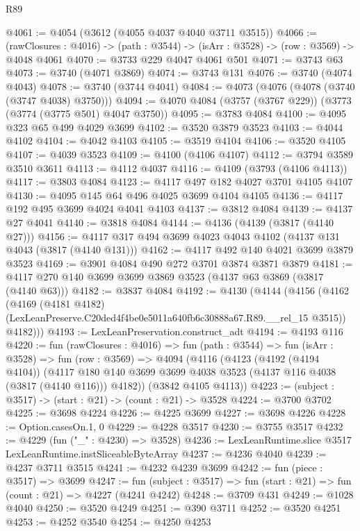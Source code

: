 \begin{lexlean}{R89}
\begin{coremodule}
@4061 := @4054 (@3612 (@4055 @4037 @4040 @3711 @3515))
@4066 := (rawClosures : @4016) -> (path : @3544) -> (isArr : @3528) -> (row : @3569) -> @4048 @4061
@4070 := @3733 @229 @4047 @4061 @501
@4071 := @3743 @63
@4073 := @3740 (@4071 @3869)
@4074 := @3743 @131
@4076 := @3740 (@4074 @4043)
@4078 := @3740 (@3744 @4041)
@4084 := @4073 (@4076 (@4078 (@3740 (@3747 @4038) @3750)))
@4094 := @4070 @4084 (@3757 (@3767 @229)) (@3773 (@3774 (@3775 @501) @4047 @3750))
@4095 := @3783 @4084
@4100 := @4095 @323 @65 @499 @4029 @3699
@4102 := @3520 @3879 @3523
@4103 := @4044 @4102
@4104 := @4042 @4103
@4105 := @3519 @4104
@4106 := @3520 @4105
@4107 := @4039 @3523
@4109 := @4100 (@4106 @4107)
@4112 := @3794 @3589 @3510 @3611
@4113 := @4112 @4037
@4116 := @4109 (@3793 (@4106 @4113))
@4117 := @3803 @4084
@4123 := @4117 @497 @182 @4027 @3701 @4105 @4107
@4130 := @4095 @145 @64 @496 @4025 @3699 @4104 @4105
@4136 := @4117 @192 @495 @3699 @4024 @4041 @4103
@4137 := @3812 @4084
@4139 := @4137 @27 @4041
@4140 := @3818 @4084
@4144 := @4136 (@4139 (@3817 (@4140 @27)))
@4156 := @4117 @317 @494 @3699 @4023 @4043 @4102 (@4137 @131 @4043 (@3817 (@4140 @131)))
@4162 := @4117 @492 @140 @4021 @3699 @3879 @3523
@4169 := @3901 @4084 @490 @272 @3701 @3874 @3871 @3879
@4181 := @4117 @270 @140 @3699 @3699 @3869 @3523 (@4137 @63 @3869 (@3817 (@4140 @63)))
@4182 := @3837 @4084
@4192 := @4130
    (@4144
      (@4156
        (@4162
          (@4169
            (@4181 @4182)
            (LexLeanPreserve.C20ded4f4be0e5011a640fb6c30888a67.R89.__rel_15 @3515))
          @4182)))
@4193 := LexLeanPreservation.construct_adt
@4194 := @4193 @116
@4220 := fun (rawClosures : @4016) =>
  fun (path : @3544) =>
  fun (isArr : @3528) =>
  fun (row : @3569) =>
  @4094
    (@4116
      (@4123
        (@4192 (@4194 @4104))
        (@4117 @180 @140 @3699 @3699 @4038 @3523 (@4137 @116 @4038 (@3817 (@4140 @116))) @4182))
      (@3842 @4105 @4113))
@4223 := (subject : @3517) -> (start : @21) -> (count : @21) -> @3528
@4224 := @3700 @3702
@4225 := @3698 @4224
@4226 := @4225 @3699
@4227 := @3698 @4226
@4228 := Option.casesOn.{1, 0}
@4229 := @4228 @3517
@4230 := @3755 @3517
@4232 := @4229 (fun ("_" : @4230) => @3528)
@4236 := LexLeanRuntime.slice @3517 LexLeanRuntime.instSliceableByteArray
@4237 := @4236 @4040
@4239 := @4237 @3711 @3515
@4241 := @4232 @4239 @3699
@4242 := fun (piece : @3517) => @3699
@4247 := fun (subject : @3517) => fun (start : @21) => fun (count : @21) => @4227 (@4241 @4242)
@4248 := @3709 @431
@4249 := @1028 @4040
@4250 := @3520 @4249
@4251 := @390 @3711
@4252 := @3520 @4251
@4253 := @4252 @3540
@4254 := @4250 @4253

\end{coremodule}
\end{lexlean}
